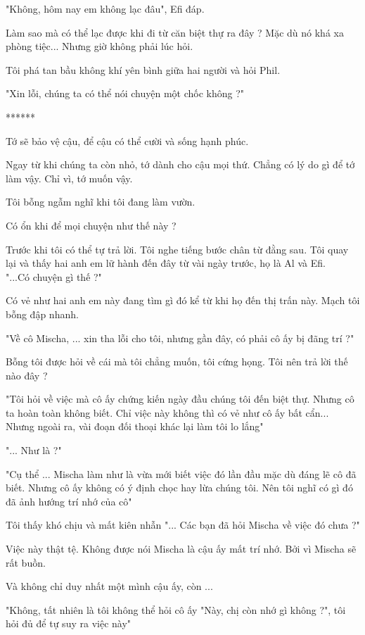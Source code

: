 "Không, hôm nay em không lạc đâu", Efi đáp.

Làm sao mà có thể lạc được khi đi từ căn biệt thự ra đây ? Mặc dù nó khá xa phòng tiệc... Nhưng giờ không phải lúc hỏi.

Tôi phá tan bầu không khí yên bình giữa hai người và hỏi Phil.

"Xin lỗi, chúng ta có thể nói chuyện một chốc không ?"

\begin{center}
	******
\end{center}

Tớ sẽ bảo vệ cậu, để cậu có thể cười và sống hạnh phúc.

Ngay từ khi chúng ta còn nhỏ, tớ dành cho cậu mọi thứ. Chẳng có lý do gì để tớ làm vậy. Chỉ vì, tớ muốn vậy.

Tôi bỗng ngẫm nghĩ khi tôi đang làm vườn.

Có ổn khi để mọi chuyện như thế này ?

Trước khi tôi có thể tự trả lời. Tôi nghe tiếng bước chân từ đằng sau. Tôi quay lại và thấy hai anh em lữ hành đến đây từ vài ngày trước, họ là Al và Efi. \\

"...Có chuyện gì thế ?"

Có vẻ như hai anh em này đang tìm gì đó kể từ khi họ đến thị trấn này. Mạch tôi bỗng đập nhanh.

"Về cô Mischa, ... xin tha lỗi cho tôi, nhưng gần đây, có phải cô ấy bị đãng trí ?"

Bỗng tôi được hỏi về cái mà tôi chẳng muốn, tôi cứng họng. Tôi nên trả lời thế nào đây ?

"Tôi hỏi về việc mà cô ấy chứng kiến ngày đầu chúng tôi đến biệt thự. Nhưng cô ta hoàn toàn không biết. Chỉ việc này không thì có vẻ như cô ấy bất cẩn... Nhưng ngoài ra, vài đoạn đối thoại khác lại làm tôi lo lắng"

"... Như là ?"

"Cụ thể ... Mischa làm như là vừa mới biết việc đó lần đầu mặc dù đáng lẽ cô đã biết. Nhưng cô ấy không có ý định chọc hay lừa chúng tôi. Nên tôi nghĩ có gì đó đã ảnh hướng trí nhớ của cô"

Tôi thấy khó chịu và mất kiên nhẫn "... Các bạn đã hỏi Mischa về việc đó chưa ?"

Việc này thật tệ. Không được nói Mischa là cậu ấy mất trí nhớ. Bởi vì Mischa sẽ rất buồn.

Và không chỉ duy nhất một mình cậu ấy, còn ...

"Không, tất nhiên là tôi không thể hỏi cô ấy "Này, chị còn nhớ gì không ?", tôi hỏi đủ để tự suy ra việc này"

